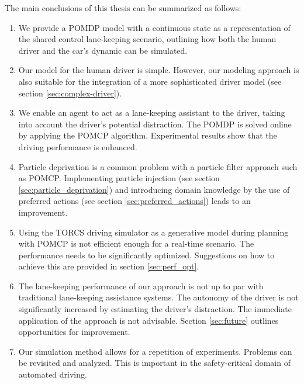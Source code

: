 \vspace{1em}
\noindent
The main conclusions of this thesis can be summarized as follows:
\begin{enumerate}
    \item We provide a POMDP model with a continuous state as a representation of the shared control lane-keeping scenario, outlining how both the human driver and the car's dynamic can be simulated. 
    \item Our model for the human driver is simple. However, our modeling approach is also suitable for the integration of a more sophisticated driver model (see section \ref{sec:complex-driver}).
    \item We enable an agent to act as a lane-keeping assistant to the driver, taking into account the driver's potential distraction. The POMDP is solved online by applying the POMCP algorithm. Experimental results show that the driving performance is enhanced.
    \item Particle deprivation is a common problem with a particle filter approach such as POMCP. Implementing particle injection (see section \ref{sec:particle_deprivation}) and introducing domain knowledge by the use of preferred actions (see section \ref{sec:preferred_actions}) leads to an improvement.
    \item Using the TORCS driving simulator as a generative model during planning with POMCP is not efficient enough for a real-time scenario. The performance needs to be significantly optimized. Suggestions on how to achieve this are provided in section \ref{sec:perf_opt}.
    \item The lane-keeping performance of our approach is not up to par with traditional lane-keeping assistance systems. The autonomy of the driver is not significantly increased by estimating the driver's distraction. The immediate application of the approach is not advisable. Section \ref{sec:future} outlines opportunities for improvement.
    \item Our simulation method allows for a repetition of experiments. Problems can be revisited and analyzed. This is important in the safety-critical domain of automated driving.
\end{enumerate}




